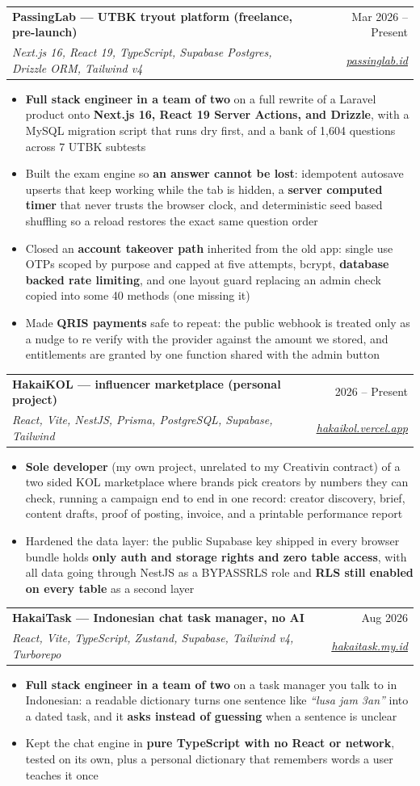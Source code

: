 \documentclass[a4paper,11pt]{article}
\makeatletter
\newcommand{\resumeItem}[1]{
  \item\small{#1}
}
\newcommand{\resumeItemListStart}{\begin{itemize}[rightmargin=0.11in]}
\newcommand{\resumeItemListEnd}{\end{itemize}}
\newcommand{\resumeQuadHeading}[4]{
  \item
  \begin{tabular*}{0.96\textwidth}[t]{l@{\extracolsep{\fill}}r}
    \textbf{#1} & #2 \\
    \textit{\small#3} & \textit{\small #4} \\
  \end{tabular*}
}
\makeatother
\begin{document}
    \resumeQuadHeading{PassingLab --- UTBK tryout platform (freelance, pre-launch)}{Mar 2026 -- Present}
    {Next.js 16, React 19, TypeScript, Supabase Postgres, Drizzle ORM, Tailwind v4}
    {\href{https://passinglab.id}{\underline{passinglab.id}}}
      \resumeItemListStart{}
        \resumeItem{\textbf{Full stack engineer in a team of two} on a full rewrite of a Laravel product onto \textbf{Next.js 16, React 19 Server Actions, and Drizzle}, with a MySQL migration script that runs dry first, and a bank of 1,604 questions across 7 UTBK subtests}
        \resumeItem{Built the exam engine so \textbf{an answer cannot be lost}: idempotent autosave upserts that keep working while the tab is hidden, a \textbf{server computed timer} that never trusts the browser clock, and deterministic seed based shuffling so a reload restores the exact same question order}
        \resumeItem{Closed an \textbf{account takeover path} inherited from the old app: single use OTPs scoped by purpose and capped at five attempts, bcrypt, \textbf{database backed rate limiting}, and one layout guard replacing an admin check copied into some 40 methods (one missing it)}
        \resumeItem{Made \textbf{QRIS payments} safe to repeat: the public webhook is treated only as a nudge to re verify with the provider against the amount we stored, and entitlements are granted by one function shared with the admin button}
      \resumeItemListEnd{}

    \resumeQuadHeading{HakaiKOL --- influencer marketplace (personal project)}{2026 -- Present}
    {React, Vite, NestJS, Prisma, PostgreSQL, Supabase, Tailwind}
    {\href{https://hakaikol.vercel.app}{\underline{hakaikol.vercel.app}}}
      \resumeItemListStart{}
        \resumeItem{\textbf{Sole developer} (my own project, unrelated to my Creativin contract) of a two sided KOL marketplace where brands pick creators by numbers they can check, running a campaign end to end in one record: creator discovery, brief, content drafts, proof of posting, invoice, and a printable performance report}
        \resumeItem{Hardened the data layer: the public Supabase key shipped in every browser bundle holds \textbf{only auth and storage rights and zero table access}, with all data going through NestJS as a BYPASSRLS role and \textbf{RLS still enabled on every table} as a second layer}
      \resumeItemListEnd{}

    \resumeQuadHeading{HakaiTask --- Indonesian chat task manager, no AI}{Aug 2026}
    {React, Vite, TypeScript, Zustand, Supabase, Tailwind v4, Turborepo}
    {\href{https://hakaitask.my.id}{\underline{hakaitask.my.id}}}
      \resumeItemListStart{}
        \resumeItem{\textbf{Full stack engineer in a team of two} on a task manager you talk to in Indonesian: a readable dictionary turns one sentence like \textit{``lusa jam 3an''} into a dated task, and it \textbf{asks instead of guessing} when a sentence is unclear}
        \resumeItem{Kept the chat engine in \textbf{pure TypeScript with no React or network}, tested on its own, plus a personal dictionary that remembers words a user teaches it once}
      \resumeItemListEnd{}
\end{document}

